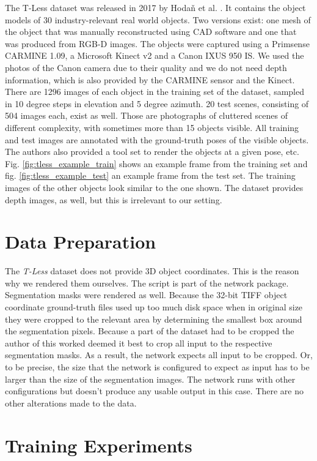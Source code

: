 The T-Less dataset was released in 2017 by Hoda\v{n} et al. \cite{tless}. It contains the object models of 30 industry-relevant real world objects. Two versions exist: one mesh of the object that was manually reconstructed using CAD software and one that was produced from RGB-D images. The objects were captured using a Primsense CARMINE 1.09, a Microsoft Kinect v2 and a Canon IXUS 950 IS. We used the photos of the Canon camera due to their quality and we do not need depth information, which is also provided by the CARMINE sensor and the Kinect. There are 1296 images of each object in the training set of the dataset, sampled in 10 degree steps in elevation and 5 degree azimuth. 20 test scenes, consisting of 504 images each, exist as well. Those are photographs of cluttered scenes of different complexity, with sometimes more than 15 objects visible. All training and test images are annotated with the ground-truth poses of the visible objects. The authors also provided a tool set to render the objects at a given pose, etc. Fig. \ref{fig:tless_example_train} shows an example frame from the training set and fig. \ref{fig:tless_example_test} an example frame from the test set. The training images of the other objects look similar to the one shown. The dataset provides depth images, as well, but this is irrelevant to our setting.

\section{Data Preparation}

The \textit{T-Less} dataset does not provide 3D object coordinates. This is the reason why we rendered them ourselves. The script is part of the network package. Segmentation masks were rendered as well. Because the 32-bit TIFF object coordinate ground-truth files used up too much disk space when in original size they were cropped to the relevant area by determining the smallest box around the segmentation pixels. Because a part of the dataset had to be cropped the author of this worked deemed it best to crop all input to the respective segmentation masks. As a result, the network expects all input to be cropped. Or, to be precise, the size that the network is configured to expect as input has to be larger than the size of the segmentation images. The network runs with other configurations but doesn't produce any usable output in this case. There are no other alterations made to the data.

\section{Training Experiments}

